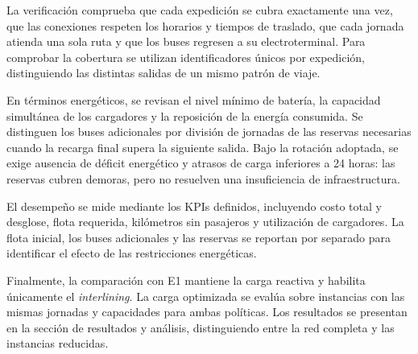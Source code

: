 La verificación comprueba que cada expedición se cubra exactamente una vez,
que las conexiones respeten los horarios y tiempos de traslado, que cada
jornada atienda una sola ruta y que los buses regresen a su electroterminal.
Para comprobar la cobertura se utilizan identificadores únicos por
expedición, distinguiendo las distintas salidas de un mismo patrón de viaje.

En términos energéticos, se revisan el nivel mínimo de batería, la capacidad
simultánea de los cargadores y la reposición de la energía consumida.
Se distinguen los buses adicionales por división de jornadas de las reservas
necesarias cuando la recarga final supera la siguiente salida. Bajo la
rotación adoptada, se exige ausencia de déficit energético y atrasos de
carga inferiores a 24 horas: las reservas cubren demoras, pero no resuelven
una insuficiencia de infraestructura.

El desempeño se mide mediante los KPIs definidos, incluyendo costo total
y desglose, flota requerida, kilómetros sin pasajeros y utilización de
cargadores. La flota inicial, los buses adicionales y las reservas se reportan
por separado para identificar el efecto de las restricciones energéticas.

Finalmente, la comparación con E1 mantiene la carga reactiva y habilita
únicamente el \textit{interlining}. La carga optimizada se evalúa sobre
instancias con las mismas jornadas y capacidades para ambas políticas.
Los resultados se presentan en la sección de resultados y análisis,
distinguiendo entre la red completa y las instancias reducidas.